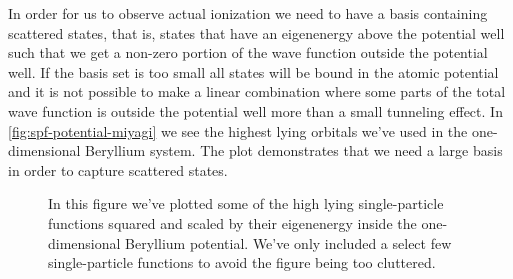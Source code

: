         In order for us to observe actual ionization we need to have a basis
        containing scattered states, that is, states that have an eigenenergy
        above the potential well such that we get a non-zero portion of the wave
        function outside the potential well.
        If the basis set is too small all states will be bound in the atomic
        potential and it is not possible to make a linear combination where
        some parts of the total wave function is outside the potential well
        more than a small tunneling effect.
        In \autoref{fig:spf-potential-miyagi} we see the highest lying
        orbitals we've used in the one-dimensional Beryllium system.
        The plot demonstrates that we need a large basis in order to capture
        scattered states.

        \begin{figure}
            \centering
            \caption{In this figure we've plotted some of the high lying
            single-particle functions squared and scaled by their
            eigenenergy inside the one-dimensional Beryllium potential.
            We've only included a select few single-particle functions to
            avoid the figure being too cluttered.}
            \label{fig:spf-potential-miyagi}
        \end{figure}

